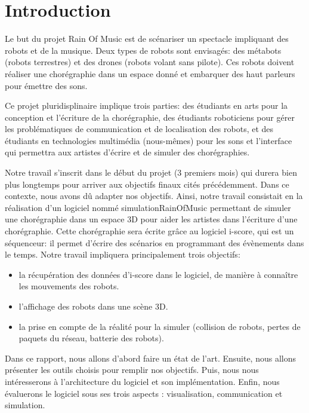 \section{Introduction}

Le but du projet Rain Of Music est de scénariser un spectacle impliquant des robots et de la musique. Deux types de robots sont envisagés: des métabots (robots terrestres) et des drones (robots volant sans pilote). Ces robots doivent réaliser une chorégraphie dans un espace donné et embarquer des haut parleurs pour émettre des sons. 

Ce projet pluridisplinaire implique trois parties: des étudiants en arts pour la conception et l'écriture de la chorégraphie, des étudiants roboticiens pour gérer les problématiques de communication et de localisation des robots, et des étudiants en technologies multimédia (nous-mêmes) pour les sons et l'interface qui permettra aux artistes d'écrire et de simuler des chorégraphies. 


Notre travail s'inscrit dans le début du projet (3 premiers mois) qui durera bien plus longtemps pour arriver aux objectifs finaux cités précédemment. Dans ce contexte, nous avons dû adapter nos objectifs. Ainsi, notre travail consistait en la réalisation d'un logiciel nommé simulationRainOfMusic permettant de simuler une chorégraphie dans un espace 3D pour aider les artistes dans l'écriture d'une chorégraphie. Cette chorégraphie sera écrite grâce au logiciel i-score, qui est un séquenceur: il permet d'écrire des scénarios en programmant des évènements dans le temps. Notre travail impliquera principalement trois objectifs: 
\begin{itemize}
\item la récupération des données d'i-score dans le logiciel, de manière à connaître les mouvements des robots.
\item l'affichage des robots dans une scène 3D.
\item la prise en compte de la réalité pour la simuler (collision de robots, pertes de paquets du réseau, batterie des robots).
\end{itemize} 

Dans ce rapport, nous allons d'abord faire un état de l'art. Ensuite, nous allons présenter les outils choisis pour remplir nos objectifs. Puis, nous nous intéresserons à l'architecture du logiciel et son implémentation. Enfin, nous évaluerons le logiciel sous ses trois aspects : visualisation, communication et simulation.

